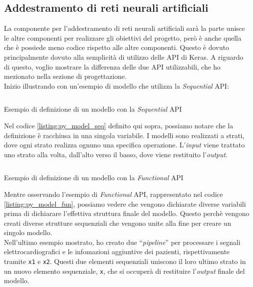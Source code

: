 \subsection{Addestramento di reti neurali artificiali}\noindent
La componente per l'addestramento di reti neurali artificiali sarà la parte unisce le altre componenti per realizzare gli obiettivi del progetto, però è anche quella che è possiede meno codice rispetto alle altre componenti.
Questo è dovuto principalmente dovuto alla semplicità di utilizzo delle API di Keras. A riguardo di questo, voglio mostrare la differenza delle due API utilizzabili, che ho mezionato nella sezione di progettazione.\\
Inizio illustrando con un'esempio di modello che utilizza la \textit{Sequential} API:
\begin{listing}[H]
    \inputminted{python}{code/model_sequential.py}
    \caption{Esempio di definizione di un modello con la \textit{Sequential} API}
    \label{listing:py_model_seq}
\end{listing}\noindent
Nel codice \ref{listing:py_model_seq} definito qui sopra, possiamo notare che la definizione è racchiusa in una singola variabile. I modelli sono realizzati a strati, dove ogni strato realizza ognuno una specifica operazione.
L'\textit{input} viene trattato uno strato alla volta, dall'alto verso il basso, dove viene restituito l'\textit{output}.\\
\begin{listing}[H]
    \inputminted[fontsize=\footnotesize]{python}{code/model_functional.py}
    \caption{Esempio di definizione di un modello con la \textit{Functional} API}
    \label{listing:py_model_fun}
\end{listing}

\newpage\noindent

Mentre osservando l'esempio di \textit{Functional} API, rappresentato nel codice \ref{listing:py_model_fun}, possiamo vedere che vengono dichiarate diverse variabili prima di dichiarare l'effettiva struttura finale del modello.
Questo perchè vengono creati diverse strutture sequenziali che vengono unite alla fine per creare un singolo modello.\\
Nell'ultimo esempio mostrato, ho creato due ``\textit{pipeline}'' per processare i segnali elettrocardiografici e le infomazioni aggiuntive dei pazienti, rispettivamente tramite \texttt{x1} e \texttt{x2}.
Questi due elementi sequenziali uniscono il loro ultimo strato in un nuovo elemento sequenziale, \texttt{x}, che si occuperà di restituire l'\textit{output} finale del modello.

